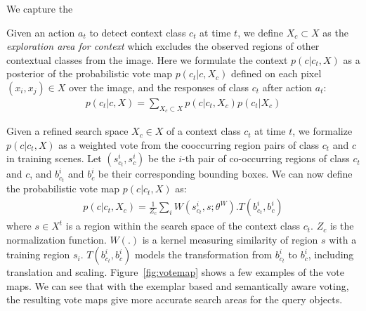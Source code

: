 We capture the 

Given an action $a_t$ to detect context class $c_t$ at time $t$, we define $X_c \subset X$ as the \textit{exploration area for context} which excludes the observed regions of other contextual classes from the image. Here we formulate the context $p(c|c_t,X)$ as a posterior of the probabilistic vote map $p(c_t|c,X_c)$ defined on each pixel $(x_i,x_j)\in X$ over the image, and the responses of class $c_t$ after action $a_t$:
\begin{eqnarray}
p(c_t|c,X) = \sum_{X_c \subset X} p(c|c_t,X_c)p(c_t|X_c)
\end{eqnarray}

Given a refined search space $X_c\in X$ of a context class $c_t$ at time $t$, we formalize $p(c|c_t,X)$ as a weighted vote from the cooccurring region pairs of class $c_t$ and $c$ in training scenes. Let $(s_{c_t}^i, s_c^i)$ be the $i$-th pair of co-occurring regions of class $c_t$ and $c$, and $b_{c_t}^i$ and $b_c^i$ be their corresponding bounding boxes. We can now define the probabilistic vote map $p(c|c_t,X)$ as:
\begin{eqnarray}
\label{eq:votemap}
p(c|c_t,X_c) = \frac{1}{Z_c}\sum_i W(s_{c_t}^i,s;\theta^W).T(b_{c_t}^i,b_c^i)
\end{eqnarray}
where $s\in X^t$ is a region within the search space of the context class $c_t$. $Z_c$ is the normalization function. $W(.)$ is a kernel measuring similarity of region $s$ with a training region $s_i$. $T(b_{c_t}^i,b_c^i)$ models the transformation from $b_{c_t}^i$ to $b_c^i$, including translation and scaling. Figure~\ref{fig:votemap} shows a few examples of the vote maps. We can see that with the exemplar based and semantically aware voting, the resulting vote maps give more accurate search areas for the query objects.


